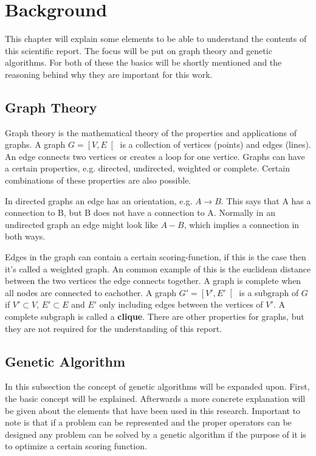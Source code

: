\section{Background}
\label{sec:background}
This chapter will explain some elements to be able to understand the contents of this scientific report.
The focus will be put on graph theory and genetic algorithms.
For both of these the basics will be shortly mentioned and the reasoning behind why they are important for this work.

\subsection{Graph Theory}
Graph theory is the mathematical theory of the properties and applications of graphs.
A graph $G=\left[V,E\right[$ is a collection of vertices (points) and edges (lines).
An edge connects two vertices or creates a loop for one vertice.
Graphs can have a certain properties, e.g. directed, undirected, weighted or complete.
Certain combinations of these properties are also possible.

In directed graphs an edge has an orientation, e.g. $A \rightarrow B$. This says that A has a connection to B, but B does not have a connection to A.
Normally in an undirected graph an edge might look like $A - B$, which implies a connection in both ways.

Edges in the graph can contain a certain scoring-function, if this is the case then it's called a weighted graph.
An common example of this is the euclidean distance between the two vertices the edge connects together.
A graph is complete when all nodes are connected to eachother.
A graph $G'=\left[V',E'\right[$ is a subgraph of $G$ if $V' \subset V$, $E' \subset E$ and $E'$ only including edges between the vertices of $V'$.
A complete subgraph is called a \textbf{clique}.
There are other properties for graphs, but they are not required for the understanding of this report.

\subsection{Genetic Algorithm}
In this subsection the concept of genetic algorithms will be expanded upon. 
First, the basic concept will be explained. 
Afterwards a more concrete explanation will be given about the elements that have been used in this research.
Important to note is that if a problem can be represented and the proper operators can be designed any problem can be solved by a genetic algorithm if the purpose of it is to optimize a certain scoring function.

